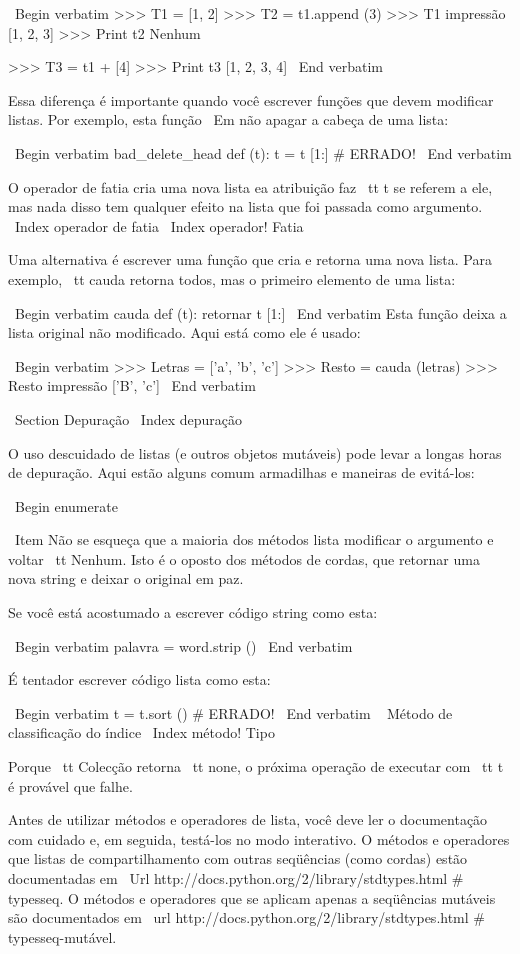 \documentclass[10pt]{book}
\begin{document}
{{{{{{{\ Begin {verbatim}
>>> T1 = [1, 2]
>>> T2 = t1.append (3)
>>> T1 impressão
[1, 2, 3]
>>> Print t2
Nenhum

>>> T3 = t1 + [4]
>>> Print t3
[1, 2, 3, 4]
\ End {verbatim}

Essa diferença é importante quando você escrever funções que
devem modificar listas. Por exemplo, esta função
{\ Em não apagar} a cabeça de uma lista:

\ Begin {verbatim}
bad_delete_head def (t):
    t = t [1:] # ERRADO!
\ End {verbatim}

O operador de fatia cria uma nova lista ea atribuição
faz {\ tt t} se referem a ele, mas nada disso tem qualquer efeito
na lista que foi passada como argumento.
\ Index {operador de fatia}
\ Index {operador! Fatia}

Uma alternativa é escrever uma função que cria e
retorna uma nova lista. Para
exemplo, {\ tt cauda} retorna todos, mas o primeiro
elemento de uma lista:

\ Begin {verbatim}
cauda def (t):
    retornar t [1:]
\ End {verbatim}
%
Esta função deixa a lista original não modificado.
Aqui está como ele é usado:

\ Begin {verbatim}
>>> Letras = ['a', 'b', 'c']
>>> Resto = cauda (letras)
>>> Resto impressão
['B', 'c']
\ End {verbatim}



\ Section {} Depuração
\ Index {depuração}

O uso descuidado de listas (e outros objetos mutáveis)
pode levar a longas horas de depuração. Aqui estão alguns comum
armadilhas e maneiras de evitá-los:

\ Begin {enumerate}

\ Item Não se esqueça que a maioria dos métodos lista modificar o argumento e
  voltar {\ tt Nenhum}. Isto é o oposto dos métodos de cordas,
  que retornar uma nova string e deixar o original em paz.

Se você está acostumado a escrever código string como esta:

\ Begin {verbatim}
palavra = word.strip ()
\ End {verbatim}

É tentador escrever código lista como esta:

\ Begin {verbatim}
t = t.sort () # ERRADO!
\ End {verbatim}
\ {} Método de classificação do índice
\ Index {método! Tipo}

Porque {\ tt Colecção} retorna {\ tt none}, o
próxima operação de executar com {\ tt t} é provável que falhe.

Antes de utilizar métodos e operadores de lista, você deve ler o
documentação com cuidado e, em seguida, testá-los no modo interativo. O
métodos e operadores que listas de compartilhamento com outras seqüências (como
cordas) estão documentadas em
\ Url {http://docs.python.org/2/library/stdtypes.html # typesseq}. O
métodos e operadores que se aplicam apenas a seqüências mutáveis
são documentados em \ url {http://docs.python.org/2/library/stdtypes.html # typesseq-mutável}.


}}}}}}}
\end{document}
